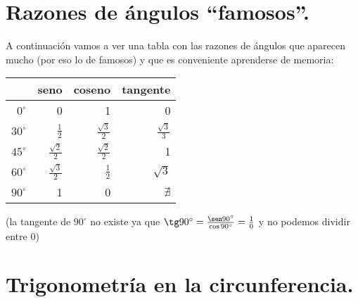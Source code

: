 \documentclass[a4paper,11pt,answers]{exam}
\newcommand{\degree}{^\circ}
\begin{document}
\section{Razones de ángulos ``famosos''.} \label{ang_famosos}
A continuación vamos a ver una tabla con las razones de ángulos que aparecen mucho (por eso lo de famosos) y que es conveniente aprenderse de memoria:
\begin{center}
\def\arraystretch{2}
\begin{tabular}{|r|r|r|r|}
  \hline
  \rowcolor{lightgray}
  \multicolumn{1}{|c|}{$\boldsymbol{\alpha}$} & \multicolumn{1}{c|}{\textbf{seno}}
  & \multicolumn{1}{c|}{\textbf{coseno}} & \multicolumn{1}{c|}{\textbf{tangente}} \\ \hline
  \cellcolor{lightgray}$0\degree$&0&1&0\\\hline
  \cellcolor{lightgray}$30\degree$&$\frac{1}{2}$&$\frac{\sqrt{3}}{2}$&$\frac{\sqrt{3}}{3}$\\\hline
  \cellcolor{lightgray}$45\degree$&$\frac{\sqrt{2}}{2}$&$\frac{\sqrt{2}}{2}$&1\\\hline
  \cellcolor{lightgray}$60\degree$&$\frac{\sqrt{3}}{2}$&$\frac{1}{2}$&$\sqrt{3}$\\\hline
  \cellcolor{lightgray}$90\degree$&1&0&$\nexists$\\\hline
\end{tabular}
\end{center}
\small{(la tangente de $90\degree$ no existe ya que $\tg 90\degree = \frac{\sen 90\degree}{\cos 90\degree} = \frac{1}{0}$ y
  no podemos dividir entre 0)}

\section{Trigonometría en la circunferencia.}
\end{document}
